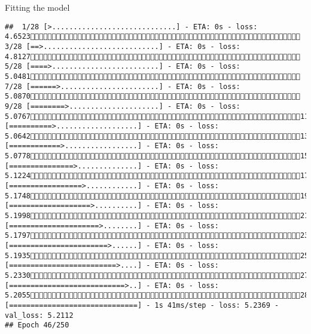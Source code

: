 \documentclass[
  ignorenonframetext,
]{beamer}
\begin{document}
\begin{frame}[fragile]{Fitting the model}
\begin{verbatim}
##  1/28 [>.............................] - ETA: 0s - loss: 4.6523 3/28 [==>...........................] - ETA: 0s - loss: 4.8127 5/28 [====>.........................] - ETA: 0s - loss: 5.0481 7/28 [======>.......................] - ETA: 0s - loss: 5.0870 9/28 [========>.....................] - ETA: 0s - loss: 5.076711/28 [==========>...................] - ETA: 0s - loss: 5.064213/28 [============>.................] - ETA: 0s - loss: 5.077815/28 [===============>..............] - ETA: 0s - loss: 5.122417/28 [=================>............] - ETA: 0s - loss: 5.174819/28 [===================>..........] - ETA: 0s - loss: 5.199821/28 [=====================>........] - ETA: 0s - loss: 5.179723/28 [=======================>......] - ETA: 0s - loss: 5.193525/28 [=========================>....] - ETA: 0s - loss: 5.233027/28 [===========================>..] - ETA: 0s - loss: 5.205528/28 [==============================] - 1s 41ms/step - loss: 5.2369 - val_loss: 5.2112
## Epoch 46/250

\end{verbatim}
\end{frame}
\end{document}
